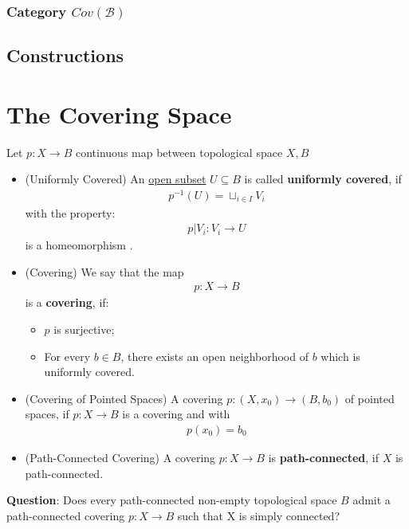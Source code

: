 \documentclass[Total.tex]{subfiles}
\begin{document}
				\subsubsection{Category $Cov(\mathscr B)$}
			\subsection{Constructions}
		\section{The Covering Space}
			\begin{Def} Let $p:X\rightarrow B$ continuous map between topological space $X,B$
				\begin{itemize}
					\item (Uniformly Covered) An \underline{open subset}  $U\subseteq B$ is called \textbf{uniformly covered}, if 
					\begin{gather*}
						p^{-1}(U)=\sqcup_{i\in I} V_i
					\end{gather*}
					with the property: 
					\begin{gather*}
						p|V_i:V_i\rightarrow U
					\end{gather*}
					is a homeomorphism .
					\item (Covering) We say that the map
					\begin{gather*}
						p:X\rightarrow B
					\end{gather*}
					is a \textbf{covering}, if:
					\begin{itemize}
						\item $p$ is surjective;
						\item For every $b\in B$, there exists an open neighborhood of $b$ which is uniformly covered. 
					\end{itemize}
					\item (Covering of Pointed Spaces) A covering $p:(X,x_0)\rightarrow (B,b_0)$ of pointed spaces, if $p:X\rightarrow B$ is a covering and with
					\begin{gather*}
						p(x_0)=b_0
					\end{gather*}
					\item (Path-Connected Covering) A covering $p:X\rightarrow B$ is \textbf{path-connected}, if $X$ is path-connected.
				\end{itemize}
			\end{Def}
			
			\textbf{Question}: Does every path-connected non-empty topological space $B$ admit a
			path-connected covering $p:X\rightarrow B$ such that X is simply connected?
			
\end{document}
